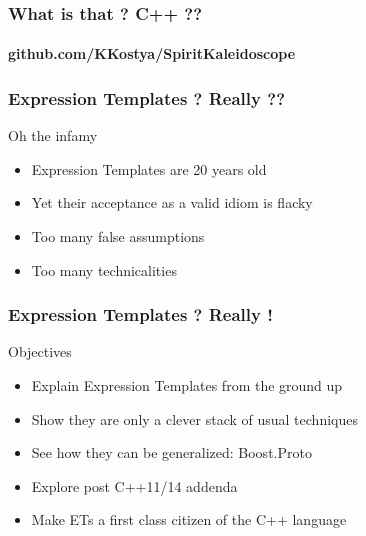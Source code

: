 \begin{frame}
\frametitle{What is that ? C++ ??}
\framesubtitle{github.com/KKostya/SpiritKaleidoscope}
\lstspirit
\end{frame}

\begin{frame}
\frametitle{Expression Templates ? Really ??}
\begin{block}{Oh the infamy}
\begin{itemize}
\item Expression Templates are 20 years old
\item Yet their acceptance as a valid idiom is flacky
\item Too many false assumptions
\item Too many technicalities
\end{itemize}
\end{block}{}
\end{frame}

{
}

\begin{frame}
\frametitle{Expression Templates ? Really !}
\begin{block}{Objectives}
\begin{itemize}
\item Explain Expression Templates from the ground up
\item Show they are only a clever stack of usual techniques
\item See how they can be generalized: Boost.Proto
\item Explore post C++11/14 addenda
\item Make ETs a first class citizen of the C++ language
\end{itemize}
\end{block}{}
\end{frame}
